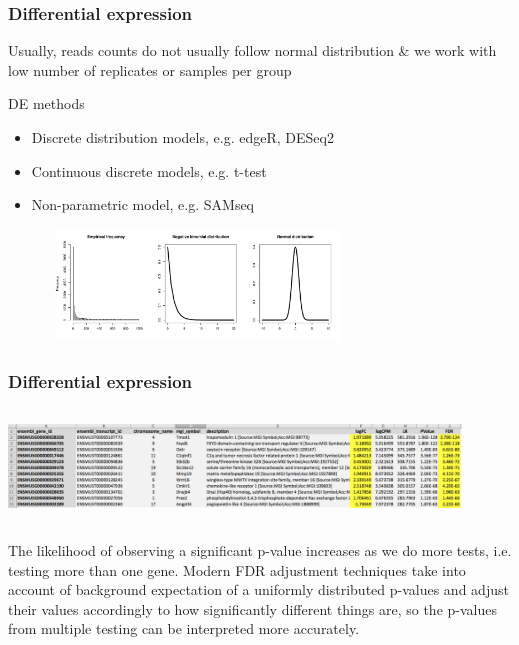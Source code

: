 \documentclass{beamer}\usepackage[]{graphicx}\usepackage[]{color}
\begin{document}
\begin{frame}
\frametitle{Differential expression}
\begin{displayquote}
Usually, reads counts do not usually follow normal distribution \& we work with low number of replicates or samples per group
\end{displayquote}
\begin{block}{DE methods}
\begin{itemize}
\item Discrete distribution models, e.g. edgeR, DESeq2
\item Continuous discrete models, e.g. t-test
\item Non-parametric model, e.g. SAMseq 
\end{itemize}
\end{block}
\begin{center}
\includegraphics[width=10cm, height=3cm]{Images/DE_distribution.pdf}
\end{center}
\end{frame}


\begin{frame}
\frametitle{Differential expression}
\vspace{1cm}
\begin{center}
\includegraphics[width=12cm, height=3cm]{Images/DE_table.png}
\end{center}
\begin{displayquote}
\footnotesize
The likelihood of observing a significant p-value increases as we do more tests, i.e. testing more than one gene. Modern FDR adjustment techniques take into account of background expectation of a uniformly distributed p-values and adjust their values accordingly to how significantly different things are, so the p-values from multiple testing can be interpreted more accurately. 
\end{displayquote}
\end{frame}
\end{document}
